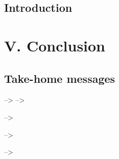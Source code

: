 \documentclass[
  12pt,
]{krantz}
\begin{document}
\hypertarget{introduction-7}{%
\chapter*{Introduction}\label{introduction-7}}


\hypertarget{part-v.-conclusion}{%
\part{V. Conclusion}\label{part-v.-conclusion}}

\hypertarget{take-home-messages}{%
\chapter*{Take-home messages}\label{take-home-messages}}


--\textgreater{}
--\textgreater{}

--\textgreater{}

--\textgreater{}

--\textgreater{}

\backmatter

  

\printindex
\end{document}
